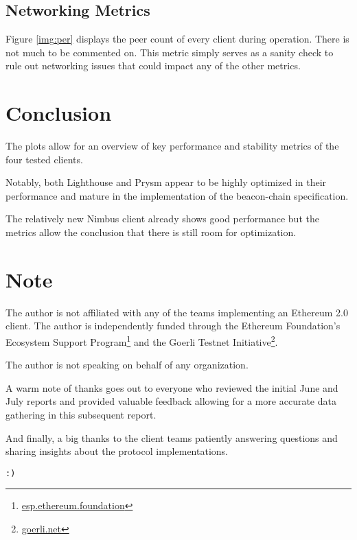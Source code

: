 \documentclass[twoside,twocolumn]{article}
\begin{document}
\subsection{Networking Metrics}
\label{sec:perf:p2p}
Figure \ref{img:per} displays the peer count of every client during operation. There is not much to be commented on. This metric simply serves as a sanity check to rule out networking issues that could impact any of the other metrics.\par

\section{Conclusion}
The plots allow for an overview of key performance and stability metrics of the four tested clients.\par

Notably, both Lighthouse and Prysm appear to be highly optimized in their performance and mature in the implementation of the beacon-chain specification.\par

The relatively new Nimbus client already shows good performance but the metrics allow the conclusion that there is still room for optimization.\par

\vspace{\fill}

\section*{Note}
The author is not affiliated with any of the teams implementing an Ethereum 2.0 client. The author is independently funded through the Ethereum Foundation's Ecosystem Support Program\footnote{\href{https://esp.ethereum.foundation}{esp.ethereum.foundation}} and the Goerli Testnet Initiative\footnote{\href{https://goerli.net}{goerli.net}}.\par

The author is not speaking on behalf of any organization.\par

A warm note of thanks goes out to everyone who reviewed the initial June and July reports and provided valuable feedback allowing for a more accurate data gathering in this subsequent report.\par

And finally, a big thanks to the client teams patiently answering questions and sharing insights about the protocol implementations.

\texttt{:)}
\end{document}
